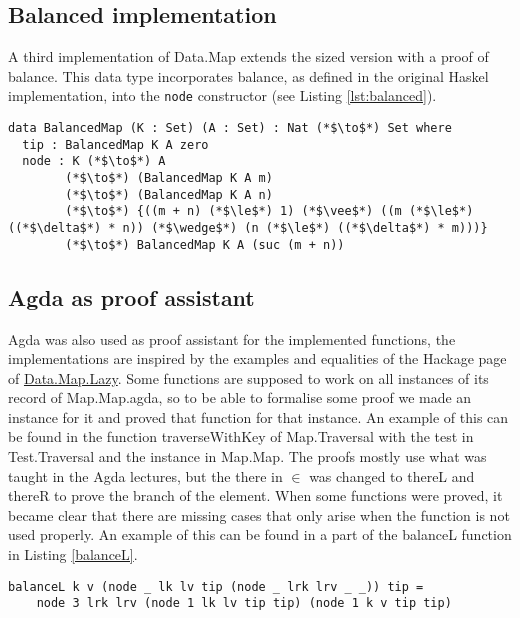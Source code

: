 \documentclass[a4paper,UKenglish,cleveref, autoref, thm-restate]{template/lipics-v2021}
\begin{document}
\subsection{Balanced implementation}
A third implementation of Data.Map extends the sized version with a proof of balance. This data type incorporates balance, as defined in the original Haskel implementation, into the \texttt{node} constructor (see Listing \ref{lst:balanced}).

\begin{lstlisting}[label=lst:balanced,caption=Balanced map. The size of the map is defined like in the sized implementation. An extra argument is added to the node constructor that enforces balance.]
  data BalancedMap (K : Set) (A : Set) : Nat (*$\to$*) Set where
  tip : BalancedMap K A zero
  node : K (*$\to$*) A
        (*$\to$*) (BalancedMap K A m)
        (*$\to$*) (BalancedMap K A n)
        (*$\to$*) {((m + n) (*$\le$*) 1) (*$\vee$*) ((m (*$\le$*) ((*$\delta$*) * n)) (*$\wedge$*) (n (*$\le$*) ((*$\delta$*) * m)))}
        (*$\to$*) BalancedMap K A (suc (m + n))
\end{lstlisting}


\subsection{Agda as proof assistant}
Agda was also used as proof assistant for the implemented functions, the implementations are inspired by the examples and equalities of the Hackage page of \href{https://hackage.haskell.org/package/containers-0.8/docs/Data-Map-Lazy.html}{Data.Map.Lazy}. 
Some functions are supposed to work on all instances of its record of Map.Map.agda, so to be able to formalise some proof we made an instance for it and proved that function for that instance. An example of this can be found in the function traverseWithKey of Map.Traversal with the test in Test.Traversal and the instance in Map.Map.
The proofs mostly use what was taught in the Agda lectures, but the there in $\in$ was changed to thereL and thereR to prove the branch of the element.
When some functions were proved, it became clear that there are missing cases that only arise when the function is not used properly. An example of this can be found in a part of the balanceL function in Listing \ref{balanceL}.

\begin{lstlisting}[label=balanceL,caption=balanceL assumes that the size of a node is 3 when the right branch is a tip.]
balanceL k v (node _ lk lv tip (node _ lrk lrv _ _)) tip = 
    node 3 lrk lrv (node 1 lk lv tip tip) (node 1 k v tip tip)
\end{lstlisting}
\end{document}
